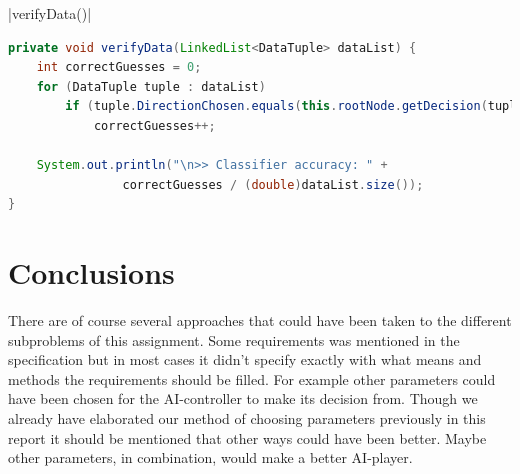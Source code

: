 \documentclass{article}
\begin{document}
    |verifyData()|
    \begin{lstlisting}[language=Java, caption=The \protect\UseVerb{verify} method, label={verifycode}, escapechar=|]
private void verifyData(LinkedList<DataTuple> dataList) {
	int correctGuesses = 0;
	for (DataTuple tuple : dataList)
		if (tuple.DirectionChosen.equals(this.rootNode.getDecision(tuple)))
			correctGuesses++;

	System.out.println("\n>> Classifier accuracy: " +
	            correctGuesses / (double)dataList.size());
} \end{lstlisting}

\section{Conclusions}
There are of course several approaches that could have been taken to the different subproblems of this assignment. Some requirements was mentioned in the specification but in most cases it didn't specify exactly with what means and methods the requirements should be filled. For example other parameters could have been chosen for the AI-controller to make its decision from. Though we already have elaborated our method of choosing parameters previously in this report it should be mentioned that other ways could have been better. Maybe other parameters, in combination, would make a better AI-player.



\end{document}
